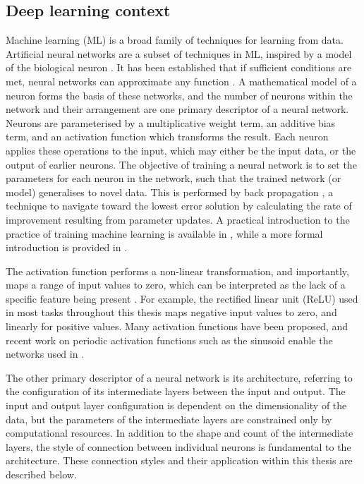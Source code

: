 \subsection{Deep learning context}
Machine learning (ML) is a broad family of techniques for learning from data.
Artificial neural networks are a subset of techniques in ML, inspired by a model of the biological neuron \parencite{bishopNeuralNetworksPattern1995}.
It has been established that if sufficient conditions are met, neural networks can approximate any function \parencite{hornikMultilayerFeedforwardNetworks1989}.
A mathematical model of a neuron forms the basis of these networks, and the number of neurons within the network and their arrangement are one primary descriptor of a neural network.
Neurons are parameterised by a multiplicative weight term, an additive bias term, and an activation function which transforms the result.
Each neuron applies these operations to the input, which may either be the input data, or the output of earlier neurons.
The objective of training a neural network is to set the parameters for each neuron in the network, such that the trained network (or model) generalises to novel data.
This is performed by back propagation \parencite{rumelhartLearningRepresentationsBackpropagating1988}, a technique to navigate toward the lowest error solution by calculating the rate of improvement resulting from parameter updates.
A practical introduction to the practice of training machine learning is available in \textcite{stevensDeepLearningPyTorch2020}, while a more formal introduction is provided in \textcite{bishopPatternRecognitionMachine2006}.

The activation function performs a non-linear transformation, and importantly, maps a range of input values to zero, which can be interpreted as the lack of a specific feature being present \parencite{williamsLogicActivationFunctions1986}.
For example, the rectified linear unit (ReLU) used in most tasks throughout this thesis maps negative input values to zero, and linearly for positive values.
Many activation functions have been proposed, and recent work on periodic activation functions such as the sinusoid \parencite{sitzmann2019siren} enable the networks used in .

The other primary descriptor of a neural network is its architecture, referring to the configuration of its intermediate layers between the input and output.
The input and output layer configuration is dependent on the dimensionality of the data, but the parameters of the intermediate layers are constrained only by computational resources.
In addition to the shape and count of the intermediate layers, the style of connection between individual neurons is fundamental to the architecture. 
These connection styles and their application within this thesis are described below.

